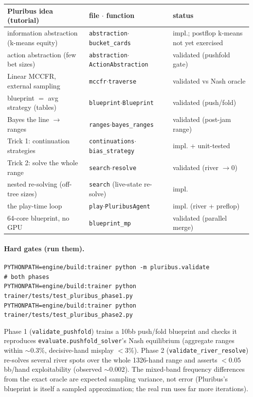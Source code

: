\documentclass[11pt,a4paper]{article}
\newcommand{\file}[1]{\textcolor{accent}{\texttt{#1}}}
\newcommand{\fn}[1]{\texttt{#1}}
\begin{document}
\begin{center}\small
\begin{tabular}{@{}lll@{}}
\toprule
Pluribus idea (tutorial) & file $\cdot$ function & status \\
\midrule
information abstraction (k-means equity) & \file{abstraction}$\cdot$\fn{bucket\_cards} & impl.; postflop k-means not yet exercised \\
action abstraction (few bet sizes) & \file{abstraction}$\cdot$\fn{ActionAbstraction} & validated (pushfold gate) \\
Linear MCCFR, external sampling & \file{mccfr}$\cdot$\fn{traverse} & validated vs Nash oracle \\
blueprint $=$ avg strategy (tables) & \file{blueprint}$\cdot$\fn{Blueprint} & validated (push/fold) \\
Bayes the line $\to$ ranges & \file{ranges}$\cdot$\fn{bayes\_ranges} & validated (post-jam range) \\
Trick 1: continuation strategies & \file{continuations}$\cdot$\fn{bias\_strategy} & impl. + unit-tested \\
Trick 2: solve the whole range & \file{search}$\cdot$\fn{resolve} & validated (river $\to 0$) \\
nested re-solving (off-tree sizes) & \file{search} (live-state re-solve) & impl. \\
the play-time loop & \file{play}$\cdot$\fn{PluribusAgent} & impl. (river + preflop) \\
64-core blueprint, no GPU & \file{blueprint\_mp} & validated (parallel merge) \\
\bottomrule
\end{tabular}
\end{center}

\paragraph{Hard gates (run them).}
\begin{lstlisting}[style=py]
PYTHONPATH=engine/build:trainer python -m pluribus.validate            # both phases
PYTHONPATH=engine/build:trainer python trainer/tests/test_pluribus_phase1.py
PYTHONPATH=engine/build:trainer python trainer/tests/test_pluribus_phase2.py
\end{lstlisting}

Phase 1 (\fn{validate\_pushfold}) trains a 10bb push/fold blueprint and checks it
reproduces \texttt{evaluate.pushfold\_solver}'s Nash equilibrium (aggregate ranges
within $\sim 0.3$\%, decisive-hand misplay $< 3$\%). Phase 2
(\fn{validate\_river\_resolve}) re-solves several river spots over the whole
1326-hand range and asserts $< 0.05$ bb/hand exploitability (observed
$\sim 0.002$). The mixed-band frequency differences from the exact oracle are
expected sampling variance, not error (Pluribus's blueprint is itself a sampled
approximation; the real run uses far more iterations).
\end{document}
